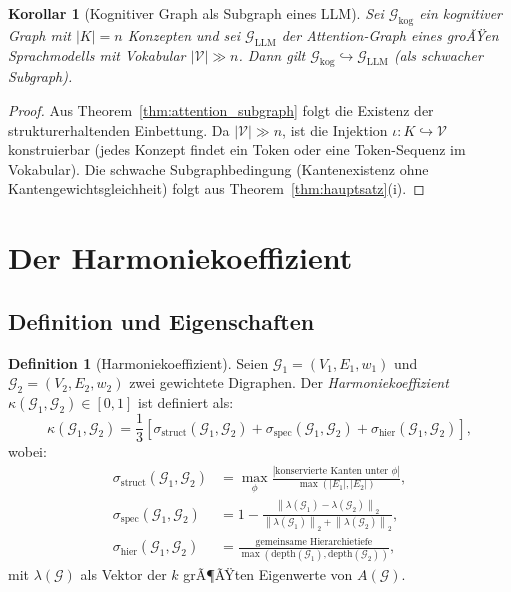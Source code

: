 ﻿\documentclass[12pt,a4paper]{article}
\theoremstyle{plain}
\newtheorem{korollar}[theorem]{Korollar}
\theoremstyle{definition}
\newtheorem{definition}[theorem]{Definition}
\theoremstyle{remark}
\newcommand{\GG}{\mathcal{G}}
\newcommand{\norm}[1]{\left\|#1\right\|}
\begin{document}
\begin{korollar}[Kognitiver Graph als Subgraph eines LLM]
\label{kor:llm_subgraph}
Sei $\GG_{\text{kog}}$ ein kognitiver Graph mit $|K| = n$ Konzepten und sei $\GG_{\text{LLM}}$ der Attention-Graph eines groÃŸen Sprachmodells mit Vokabular $|\mathcal{V}| \gg n$. Dann gilt $\GG_{\text{kog}} \hookrightarrow \GG_{\text{LLM}}$ (als schwacher Subgraph).
\end{korollar}

\begin{proof}
Aus Theorem~\ref{thm:attention_subgraph} folgt die Existenz der strukturerhaltenden Einbettung. Da $|\mathcal{V}| \gg n$, ist die Injektion $\iota: K \hookrightarrow \mathcal{V}$ konstruierbar (jedes Konzept findet ein Token oder eine Token-Sequenz im Vokabular). Die schwache Subgraphbedingung (Kantenexistenz ohne Kantengewichtsgleichheit) folgt aus Theorem~\ref{thm:hauptsatz}(i).
\end{proof}

\section{Der Harmoniekoeffizient}
\label{sec:harmonie}

\subsection{Definition und Eigenschaften}

\begin{definition}[Harmoniekoeffizient]
\label{def:harmonie}
Seien $\GG_1 = (V_1, E_1, w_1)$ und $\GG_2 = (V_2, E_2, w_2)$ zwei gewichtete Digraphen. Der \emph{Harmoniekoeffizient} $\kappa(\GG_1, \GG_2) \in [0,1]$ ist definiert als:
\[
  \kappa(\GG_1, \GG_2) = \frac{1}{3}\left[\sigma_{\text{struct}}(\GG_1, \GG_2) + \sigma_{\text{spec}}(\GG_1, \GG_2) + \sigma_{\text{hier}}(\GG_1, \GG_2)\right],
\]
wobei:
\begin{align}
  \sigma_{\text{struct}}(\GG_1, \GG_2) &= \max_{\phi} \frac{|\text{konservierte Kanten unter } \phi|}{\max(|E_1|, |E_2|)}, \\[6pt]
  \sigma_{\text{spec}}(\GG_1, \GG_2) &= 1 - \frac{\norm{\lambda(\GG_1) - \lambda(\GG_2)}_2}{\norm{\lambda(\GG_1)}_2 + \norm{\lambda(\GG_2)}_2}, \\[6pt]
  \sigma_{\text{hier}}(\GG_1, \GG_2) &= \frac{\text{gemeinsame Hierarchietiefe}}{\max(\text{depth}(\GG_1), \text{depth}(\GG_2))},
\end{align}
mit $\lambda(\GG)$ als Vektor der $k$ grÃ¶ÃŸten Eigenwerte von $A(\GG)$.
\end{definition}
\end{document}
